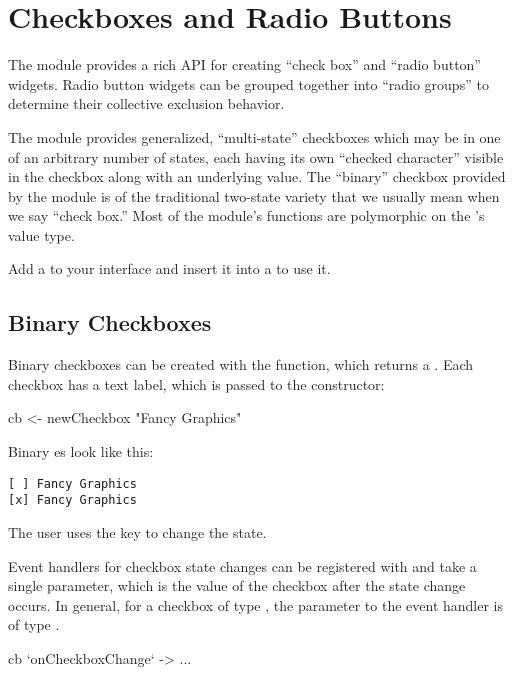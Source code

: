 \section{Checkboxes and Radio Buttons}

The  module provides a rich API for creating ``check
box'' and ``radio button'' widgets.  Radio button widgets can be
grouped together into ``radio groups'' to determine their collective
exclusion behavior.

The  module provides generalized, ``multi-state''
checkboxes which may be in one of an arbitrary number of states, each
having its own ``checked character'' visible in the checkbox along
with an underlying value.  The ``binary'' checkbox provided by the
module is of the traditional two-state variety that we usually mean
when we say ``check box.''  Most of the  module's
functions are polymorphic on the 's value type.

Add a  to your interface and insert it into a
 to use it.

\subsection{Binary Checkboxes}

Binary checkboxes can be created with the  function,
which returns a .  Each checkbox has a text
label, which is passed to the constructor:

\begin{haskellcode}
 cb <- newCheckbox "Fancy Graphics"
\end{haskellcode}

Binary es look like this:

\begin{verbatim}
[ ] Fancy Graphics
[x] Fancy Graphics
\end{verbatim}

The user uses the  key to change the  state.

Event handlers for checkbox state changes can be registered with
 and take a single parameter, which is the value
of the checkbox after the state change occurs.  In general, for a
checkbox of type , the parameter to the event
handler is of type .

\begin{haskellcode}
 cb `onCheckboxChange` \val ->
   ...
\end{haskellcode}

